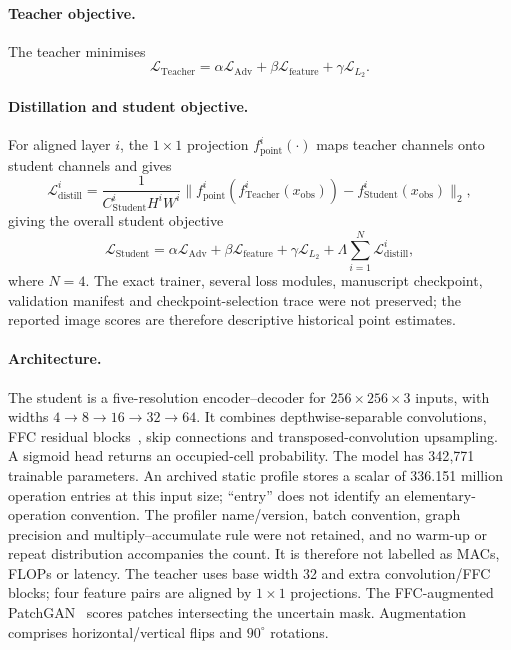 \documentclass[11pt]{article}
\begin{document}
\paragraph{Teacher objective.}
The teacher minimises
\begin{equation}
	\mathcal{L}_{\text{Teacher}} = \alpha \mathcal{L}_{\text{Adv}} + \beta \mathcal{L}_{\mathrm{feature}} + \gamma \mathcal{L}_{L_2} .
\end{equation}

\paragraph{Distillation and student objective.}
For aligned layer $i$, the $1\times1$ projection $f_{\mathrm{point}}^{i}(\cdot)$ maps teacher channels onto student channels and gives
\nopagebreak[4]
\begin{equation}
	\mathcal{L}_{\mathrm{distill}}^i=\frac{1}{C^{i}_{\mathrm{Student}} H^i W^i}\|f_{\mathrm{point}}^i(f_{\mathrm{Teacher}}^i(x_{\mathrm{obs}}))-f_{\mathrm{Student}}^i(x_{\mathrm{obs}})\|_2 ,
\end{equation}
giving the overall student objective
\begin{equation}
	\mathcal{L}_{\text{Student}} = \alpha\mathcal{L}_{\text{Adv}} + \beta \mathcal{L}_{\text{feature}} + \gamma \mathcal{L}_{L_2} + \Lambda \sum_{i=1}^{N}\mathcal{L}_{\text{distill}}^i ,
\end{equation}
where $N=4$. The exact trainer, several loss modules, manuscript checkpoint, validation manifest and checkpoint-selection trace were not preserved; the reported image scores are therefore descriptive historical point estimates.

\paragraph{Architecture.}
The student is a five-resolution encoder--decoder for $256{\times}256{\times}3$ inputs, with widths $4\!\to\!8\!\to\!16\!\to\!32\!\to\!64$. It combines depthwise-separable convolutions, FFC residual blocks~\citep{suvorov2021resolution,chi2020fast}, skip connections and transposed-convolution upsampling. A sigmoid head returns an occupied-cell probability. The model has 342{,}771 trainable parameters. An archived static profile stores a scalar of 336.151 million operation entries at this input size; ``entry'' does not identify an elementary-operation convention. The profiler name/version, batch convention, graph precision and multiply--accumulate rule were not retained, and no warm-up or repeat distribution accompanies the count. It is therefore not labelled as MACs, FLOPs or latency. The teacher uses base width 32 and extra convolution/FFC blocks; four feature pairs are aligned by $1{\times}1$ projections. The FFC-augmented PatchGAN~\citep{isola2017image,suvorov2021resolution} scores patches intersecting the uncertain mask. Augmentation comprises horizontal/vertical flips and $90^{\circ}$ rotations.
\end{document}
